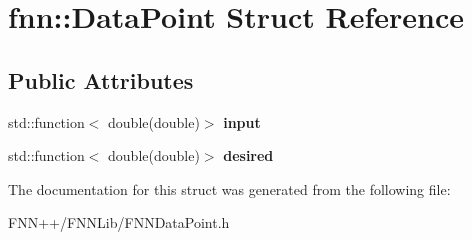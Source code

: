 \hypertarget{structfnn_1_1_data_point}{}\section{fnn\+:\+:Data\+Point Struct Reference}
\label{structfnn_1_1_data_point}
\subsection*{Public Attributes}
\begin{DoxyCompactItemize}
\item 
\hypertarget{structfnn_1_1_data_point_ace02aecf57f3fbfdddd6e1b069284d8e}{}std\+::function$<$ double(double)$>$ {\bfseries input}\label{structfnn_1_1_data_point_ace02aecf57f3fbfdddd6e1b069284d8e}

\item 
\hypertarget{structfnn_1_1_data_point_a688e7e9c6cac80b17b3e20226b07b839}{}std\+::function$<$ double(double)$>$ {\bfseries desired}\label{structfnn_1_1_data_point_a688e7e9c6cac80b17b3e20226b07b839}

\end{DoxyCompactItemize}


The documentation for this struct was generated from the following file\+:\begin{DoxyCompactItemize}
\item 
F\+N\+N++/\+F\+N\+N\+Lib/F\+N\+N\+Data\+Point.\+h\end{DoxyCompactItemize}
